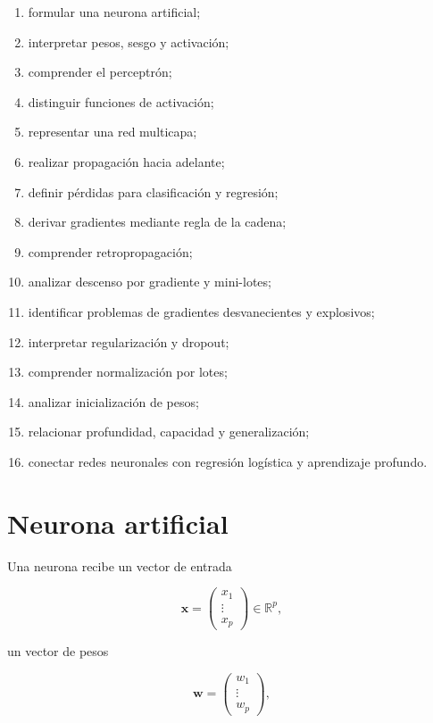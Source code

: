 \documentclass[
  spanish,
  10.5pt,
  letterpaper,
  DIV=11,
  numbers=noendperiod,
  oneside,
  open=any]{scrreprt}
\providecommand{\tightlist}{%
  \setlength{\itemsep}{0pt}\setlength{\parskip}{0pt}}
\theoremstyle{definition}
\theoremstyle{definition}
\theoremstyle{plain}
\theoremstyle{remark}
\begin{document}
\begin{enumerate}
\def\labelenumi{\arabic{enumi}.}
\tightlist
\item
  formular una neurona artificial;
\item
  interpretar pesos, sesgo y activación;
\item
  comprender el perceptrón;
\item
  distinguir funciones de activación;
\item
  representar una red multicapa;
\item
  realizar propagación hacia adelante;
\item
  definir pérdidas para clasificación y regresión;
\item
  derivar gradientes mediante regla de la cadena;
\item
  comprender retropropagación;
\item
  analizar descenso por gradiente y mini-lotes;
\item
  identificar problemas de gradientes desvanecientes y explosivos;
\item
  interpretar regularización y dropout;
\item
  comprender normalización por lotes;
\item
  analizar inicialización de pesos;
\item
  relacionar profundidad, capacidad y generalización;
\item
  conectar redes neuronales con regresión logística y aprendizaje
  profundo.
\end{enumerate}

\section*{Neurona artificial}\label{neurona-artificial}


Una neurona recibe un vector de entrada

\[
\mathbf{x}
=
\begin{pmatrix}
x_1\\
\vdots\\
x_p
\end{pmatrix}
\in\mathbb{R}^{p},
\]

un vector de pesos

\[
\mathbf{w}
=
\begin{pmatrix}
w_1\\
\vdots\\
w_p
\end{pmatrix},
\]
\end{document}

